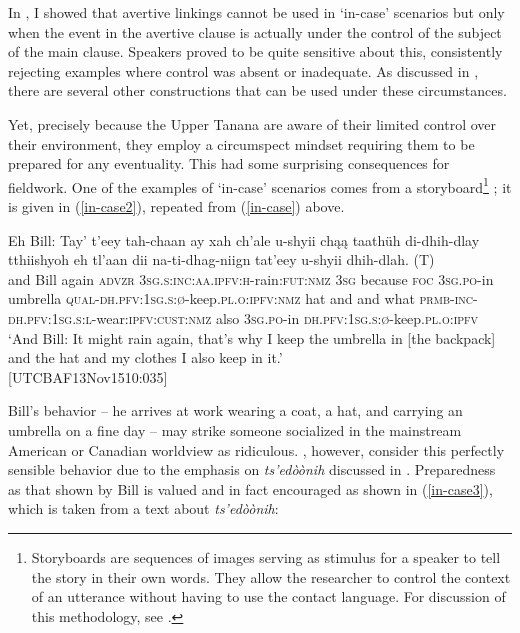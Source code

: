 \documentclass[output=paper,colorlinks,citecolor=brown]{langscibook}
\begin{document}
In , I showed that avertive linkings cannot be used in `in-case' scenarios but only when the event in the avertive clause is actually under the control of the subject of the main clause. Speakers proved to be quite sensitive about this, consistently rejecting examples where control was absent or inadequate. As discussed in , there are several other constructions that can be used under these circumstances.

Yet, precisely because the Upper Tanana are aware of their limited control over their environment, they employ a circumspect mindset requiring them to be prepared for any eventuality. This had some surprising consequences for fieldwork. One of the examples of `in-case' scenarios  comes from a storyboard\footnote{Storyboards are sequences of images serving as stimulus for a speaker to tell the story in their own words. They allow the researcher to control the context of an utterance without having to use the contact language. For discussion of this methodology, see \citet{BurtonSMatthewsonL2015}.} \citep{vanderKlokJ2013}; it is given in (\ref{in-case2}), repeated from (\ref{in-case}) above.

\ea \label{in-case2}
\gll  Eh Bill: Tay' t'eey tah-chaan ay xah ch'ale  u-shyii {chąą taathüh} di-dhih-dlay tthiishyoh eh tl'aan dii na-ti-dhag-niign tat'eey u-shyii {dhih-dlah. \textnormal{(T)}} \\
and Bill again \textsc{advzr} \textsc{3sg.s:inc:aa.ipfv:h}-rain:\textsc{fut:nmz} \textsc{3sg} because \textsc{foc} \textsc{3sg.po}-in umbrella \textsc{qual-dh.pfv:1sg.s:ø}-keep.\textsc{pl.o:ipfv:nmz} hat and and what \textsc{prmb-inc-dh.pfv:1sg.s:l}-wear:\textsc{ipfv:cust:nmz} also \textsc{3sg.po}-in \textsc{dh.pfv:1sg.s:ø}-keep.\textsc{pl.o:ipfv} \\
\glt `And Bill: It might rain again, that's why I keep the umbrella in [the backpack] and the hat and my clothes I also keep in it.' \\ \hfill [UTCBAF13Nov1510:035]
\z

\noindent Bill's behavior -- he arrives at work wearing a coat, a hat, and carrying an umbrella on a fine day -- may strike someone socialized in the mainstream American or Canadian worldview as ridiculous.  , however, consider this perfectly sensible behavior due to the emphasis on \textit{ts'edòònih} discussed in . Preparedness as that shown by Bill is valued and in fact encouraged as shown in (\ref{in-case3}), which is taken from a text about \textit{ts'edòònih}:
 
\end{document}
